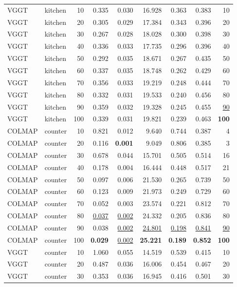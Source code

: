 \begin{table}[H]
\begin{tabular}{llrrrrrrr}
VGGT & kitchen & 10 & 0.335 & 0.030 & 16.928 & 0.363 & 0.383 & 10 \\
VGGT & kitchen & 20 & 0.305 & 0.029 & 17.384 & 0.343 & 0.396 & 20 \\
VGGT & kitchen & 30 & 0.267 & 0.028 & 18.028 & 0.300 & 0.398 & 30 \\
VGGT & kitchen & 40 & 0.336 & 0.033 & 17.735 & 0.296 & 0.396 & 40 \\
VGGT & kitchen & 50 & 0.292 & 0.035 & 18.671 & 0.267 & 0.435 & 50 \\
VGGT & kitchen & 60 & 0.337 & 0.035 & 18.748 & 0.262 & 0.429 & 60 \\
VGGT & kitchen & 70 & 0.356 & 0.033 & 19.219 & 0.248 & 0.444 & 70 \\
VGGT & kitchen & 80 & 0.332 & 0.031 & 19.533 & 0.240 & 0.456 & 80 \\
VGGT & kitchen & 90 & 0.359 & 0.032 & 19.328 & 0.245 & 0.455 & \underline{90} \\
VGGT & kitchen & 100 & 0.339 & 0.031 & 19.821 & 0.239 & 0.463 & \textbf{100} \\
\midrule
COLMAP & counter & 10 & 0.821 & 0.012 & 9.640 & 0.744 & 0.387 & 4 \\
COLMAP & counter & 20 & 0.116 & \textbf{0.001} & 9.049 & 0.806 & 0.385 & 3 \\
COLMAP & counter & 30 & 0.678 & 0.044 & 15.701 & 0.505 & 0.514 & 16 \\
COLMAP & counter & 40 & 0.178 & 0.004 & 16.444 & 0.448 & 0.517 & 21 \\
COLMAP & counter & 50 & 0.097 & 0.006 & 21.530 & 0.265 & 0.739 & 50 \\
COLMAP & counter & 60 & 0.123 & 0.009 & 21.973 & 0.249 & 0.729 & 60 \\
COLMAP & counter & 70 & 0.052 & 0.003 & 23.574 & 0.221 & 0.812 & 70 \\
COLMAP & counter & 80 & \underline{0.037} & \underline{0.002} & 24.332 & 0.205 & 0.836 & 80 \\
COLMAP & counter & 90 & 0.038 & \underline{0.002} & \underline{24.801} & \underline{0.198} & \underline{0.841} & \underline{90} \\
COLMAP & counter & 100 & \textbf{0.029} & \underline{0.002} & \textbf{25.221} & \textbf{0.189} & \textbf{0.852} & \textbf{100} \\
VGGT & counter & 10 & 1.060 & 0.055 & 14.519 & 0.539 & 0.415 & 10 \\
VGGT & counter & 20 & 0.487 & 0.036 & 16.006 & 0.454 & 0.467 & 20 \\
VGGT & counter & 30 & 0.353 & 0.036 & 16.945 & 0.416 & 0.501 & 30 \\

\end{tabular}
\end{table}
